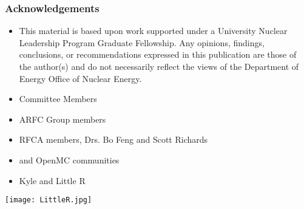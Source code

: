 \begin{frame}
    \frametitle{Acknowledgements}
    \begin{itemize}
        \item This material is based upon work supported under a University 
        Nuclear Leadership Program Graduate Fellowship. Any opinions, findings, conclusions, or 
    recommendations expressed in this publication are those of the author(s) 
    and do not necessarily reflect the views of the Department of Energy Office 
    of Nuclear Energy.
        \item Committee Members
        \item ARFC Group members
        \item RFCA members, Drs. Bo Feng and Scott Richards
        \item \Cyclus and OpenMC communities
        \item Kyle and Little R
    \end{itemize}
\end{frame}

\begin{frame}
    \centering
    \texttt{[image: LittleR.jpg]}
\end{frame}